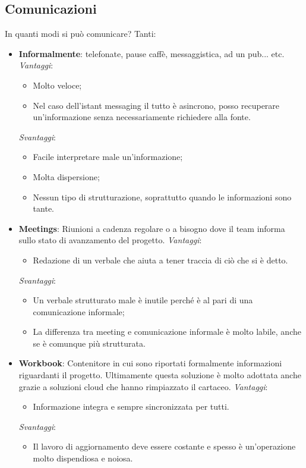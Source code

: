 \subsection{Comunicazioni}
In quanti modi si può comunicare? Tanti:
\begin{itemize}
	\item \textbf{Informalmente}: telefonate, pause caffè, messaggistica, ad un pub... etc.\newline
	\textit{Vantaggi}:
	\begin{itemize}
		\item Molto veloce;
		\item Nel caso dell'istant messaging il tutto è asincrono, posso recuperare un'informazione senza necessariamente richiedere alla fonte.
	\end{itemize}
	\textit{Svantaggi}:
	\begin{itemize}
		\item Facile interpretare male un'informazione;
		\item Molta dispersione;
		\item Nessun tipo di strutturazione, soprattutto quando le informazioni sono tante.
	\end{itemize}
	\item \textbf{Meetings}: Riunioni a cadenza regolare o a bisogno dove il team informa sullo stato di avanzamento del progetto.\newline
	\textit{Vantaggi}:
	\begin{itemize}
		\item Redazione di un verbale che aiuta a tener traccia di ciò che si è detto.
	\end{itemize}
	\textit{Svantaggi}:
	\begin{itemize}
		\item Un verbale strutturato male è inutile perché è al pari di una comunicazione informale;
		\item La differenza tra meeting e comunicazione informale è molto labile, anche se è comunque più strutturata.
	\end{itemize}
	\item \textbf{Workbook}: Contenitore in cui sono riportati formalmente informazioni riguardanti il progetto. Ultimamente questa soluzione è molto adottata anche grazie a soluzioni cloud che hanno rimpiazzato il cartaceo.\newline
	\textit{Vantaggi}:
	\begin{itemize}
		\item Informazione integra e sempre sincronizzata per tutti.
	\end{itemize}
	\textit{Svantaggi}:
	\begin{itemize}
		\item Il lavoro di aggiornamento deve essere costante e spesso è un'operazione molto dispendiosa e noiosa.
	\end{itemize}
\end{itemize}
